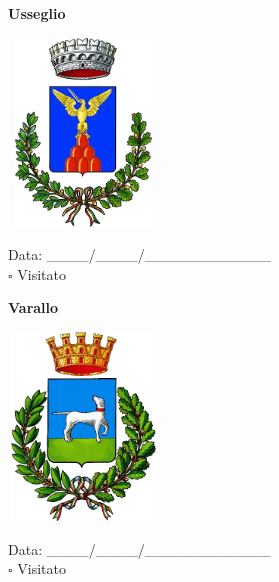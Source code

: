 \documentclass[a5paper,12pt]{article}
\begin{document}
\newpage

\noindent
\begin{minipage}[t]{0.45\textwidth}
    \begin{center}
        \textbf{Usseglio}
    \end{center}
    \vspace{-0.5cm} %
    \begin{center}
        \includegraphics[height= 5cm, width=4cm]{Piemonte/Stemma Usseglio.png}
    \end{center}
    \vspace{-0.4cm} %
    \begin{flushleft}
        Data: \_\_\_\_/\_\_\_\_/\_\_\_\_\_\_\_\_\_\_\_\_ \\
        $\square$ Visitato
    \end{flushleft}
\end{minipage}
\hfill
\noindent
\begin{minipage}[t]{0.45\textwidth}
    \begin{center}
        \textbf{Varallo}
    \end{center}
    \vspace{-0.5cm} %
    \begin{center}
        \includegraphics[height= 5cm, width=4cm]{Piemonte/Stemma Varallo.png}
    \end{center}
    \vspace{-0.4cm} %
    \begin{flushleft}
        Data: \_\_\_\_/\_\_\_\_/\_\_\_\_\_\_\_\_\_\_\_\_ \\
        $\square$ Visitato
    \end{flushleft}
\end{minipage}
\end{document}
